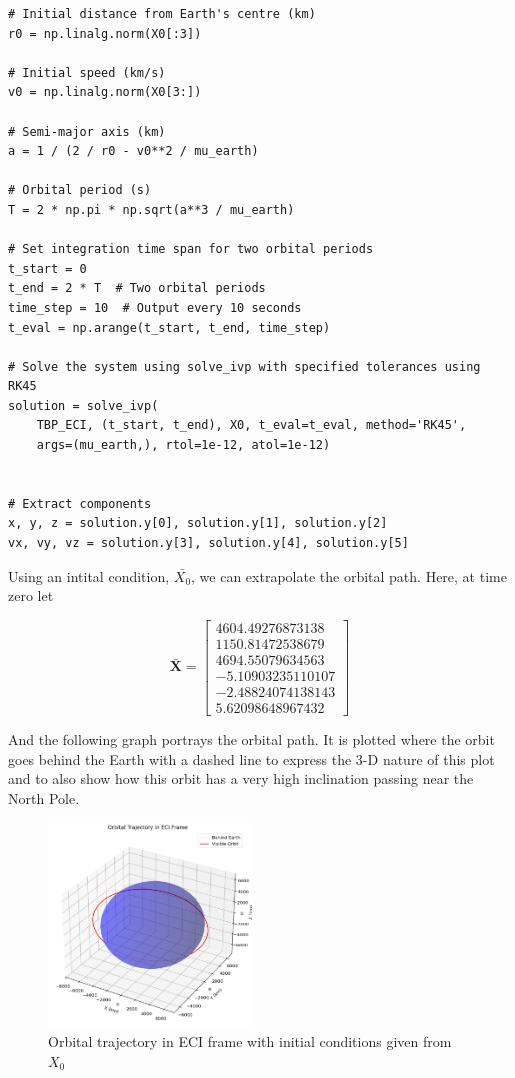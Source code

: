 \documentclass[12pt,twocolumn]{article}  %
\begin{document}
\begin{lstlisting}
# Initial distance from Earth's centre (km)
r0 = np.linalg.norm(X0[:3]) 
    
# Initial speed (km/s)
v0 = np.linalg.norm(X0[3:]) 
    
# Semi-major axis (km)
a = 1 / (2 / r0 - v0**2 / mu_earth)  

# Orbital period (s)
T = 2 * np.pi * np.sqrt(a**3 / mu_earth)  

# Set integration time span for two orbital periods
t_start = 0
t_end = 2 * T  # Two orbital periods
time_step = 10  # Output every 10 seconds
t_eval = np.arange(t_start, t_end, time_step)  

# Solve the system using solve_ivp with specified tolerances using RK45
solution = solve_ivp(
    TBP_ECI, (t_start, t_end), X0, t_eval=t_eval, method='RK45',
    args=(mu_earth,), rtol=1e-12, atol=1e-12)


# Extract components
x, y, z = solution.y[0], solution.y[1], solution.y[2]
vx, vy, vz = solution.y[3], solution.y[4], solution.y[5]

\end{lstlisting}

Using an intital condition, $\bar{X_0}$, we can extrapolate the orbital path. Here, at time zero let 

\begin{equation}
    \mathbf{\bar{X}} = 
    \begin{bmatrix}
        4604.49276873138 \\
        1150.81472538679 \\
        4694.55079634563 \\
        -5.10903235110107   \\
        -2.48824074138143 \\
        5.62098648967432
        \end{bmatrix}
\end{equation}

And the following graph portrays the orbital path. It is plotted where the orbit goes behind the Earth with a dashed line
to express the 3-D nature of this plot and to also show how this orbit has a very high inclination passing near the North Pole.
\begin{figure}[H]
    \centering
    \includegraphics[width=0.48\textwidth]{Images/123-3d.png}
    \caption{Orbital trajectory in ECI frame with initial conditions given from $X_0$}
\end{figure}
\end{document}
